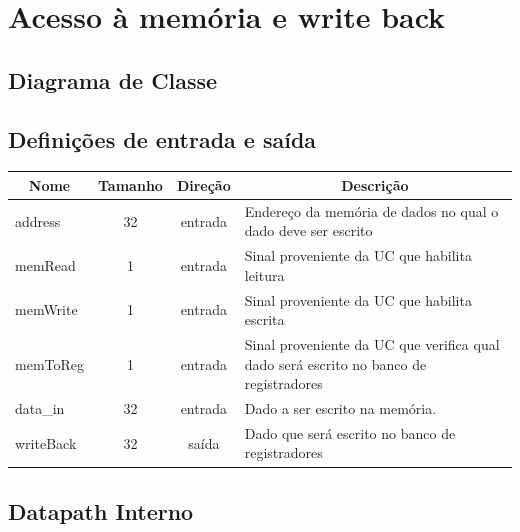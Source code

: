 \section{Acesso à memória e write back}
	\subsection{Diagrama de Classe}
  \begin{figure}[H]
    
  \end{figure}

\subsection{Definições de entrada e saída}

	\begin{center}
        \begin{longtable}[pos]{| l | c | c | m{7cm} |} \hline
          \multicolumn{1}{|c|}{\cellcolor[gray]{0.9}\textbf{Nome}} & 
          \multicolumn{1}{c|}{\cellcolor[gray]{0.9}\textbf{Tamanho}} & 
          \multicolumn{1}{c|}{\cellcolor[gray]{0.9}\textbf{Direção}} &
          \multicolumn{1}{c|}{\cellcolor[gray]{0.9}\textbf{Descrição}} \\ \hline
          \endhead
          \hline
          \endlastfoot

          address & 32 & entrada & Endereço da memória de dados no qual o dado deve ser escrito   \\ \hline
          memRead                  & 1   & entrada   & Sinal proveniente da UC que habilita leitura    \\ \hline
          memWrite                 & 1   & entrada   & Sinal proveniente da UC que habilita escrita    \\ \hline
	      memToReg                 & 1   & entrada  & Sinal proveniente da UC que verifica qual dado será escrito no banco de registradores  \\ \hline
          data\_in      		   & 32   & entrada   & Dado a ser escrito na memória. \\ \hline
          writeBack	 & 32  & saída  & Dado que será escrito no banco de registradores \\ \hline
        \end{longtable}
      \end{center}
    
    \newpage  
\subsection{Datapath Interno}
	
